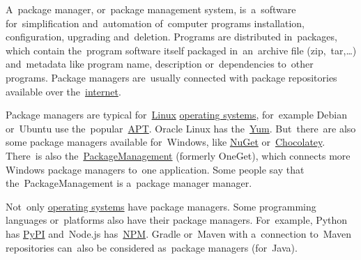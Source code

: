\label{packagemanager}
A~package manager, or~package management system, is~a~software for~simplification and~automation of~computer programs installation, configuration, upgrading and~deletion.
Programs are distributed in~packages, which contain the~program software itself packaged in~an~archive file (zip,~tar,\dots) and~metadata like program name, description or~dependencies to~other programs.
Package managers are~usually connected with package repositories available over the~\hyperref[internetweb]{internet}.

Package managers are typical for~\hyperref[linux]{Linux} \hyperref[os]{operating systems}, for~example Debian or~Ubuntu use the~popular~\hyperref[linuxapt]{APT}.
Oracle Linux has the~\href{http://yum.baseurl.org/}{Yum}.
But~there~are also some package managers available for~Windows, like \href{https://www.nuget.org/}{NuGet} or~\href{https://chocolatey.org/}{Chocolatey}.
There~is also the~\hyperref[powershellpackagemanagement]{PackageManagement} (formerly OneGet), which connects more Windows package managers to~one application.
Some people say that the~PackageManagement is a~package manager manager.

Not~only \hyperref[os]{operating systems} have package managers.
Some programming languages or~platforms also have their package managers.
For~example, Python has \href{https://pypi.org/}{PyPI} and~Node.js has~\hyperref[npm]{NPM}.
Gradle or~Maven with a~connection to~Maven repositories can~also be considered as~package managers (for~Java).
